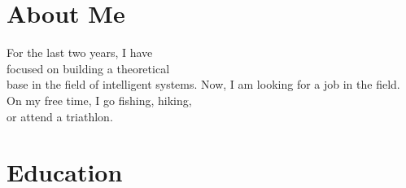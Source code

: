 \documentclass[]{deedy-resume}
\begin{document}
%
%
\lastupdated

%
%

%
%

\begin{minipage}[t]{0.33\textwidth} 

\section{About Me}
For the last two years, I have \\ 
focused on building a theoretical \\
base in the field of intelligent systems.
Now, I am looking for a job in the field. \\     
On my free time, I go fishing, hiking, \\ or attend a triathlon.
\sectionsep

\section{Education} 

%


\end{minipage}
\end{document}

